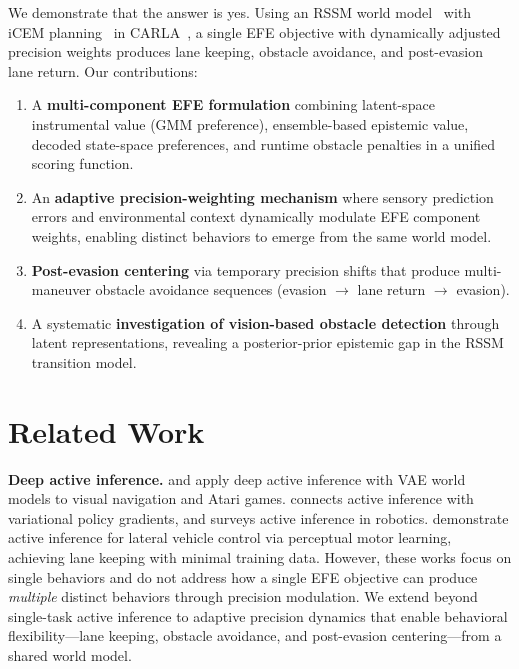 \documentclass{article}
\begin{document}
We demonstrate that the answer is yes. Using an RSSM world
model~\citep{hafner2023mastering} with iCEM
planning~\citep{pinneri2021sample} in
CARLA~\citep{dosovitskiy2017carla}, a single EFE objective with
dynamically adjusted precision weights produces lane keeping,
obstacle avoidance, and post-evasion lane return. Our contributions:

\begin{enumerate}
    \item A \textbf{multi-component EFE formulation} combining
    latent-space instrumental value (GMM preference), ensemble-based
    epistemic value, decoded state-space preferences, and runtime
    obstacle penalties in a unified scoring function.

    \item An \textbf{adaptive precision-weighting mechanism} where
    sensory prediction errors and environmental context dynamically
    modulate EFE component weights, enabling distinct behaviors to
    emerge from the same world model.

    \item \textbf{Post-evasion centering} via temporary precision
    shifts that produce multi-maneuver obstacle avoidance sequences
    (evasion $\rightarrow$ lane return $\rightarrow$ evasion).

    \item A systematic \textbf{investigation of vision-based
    obstacle detection} through latent representations, revealing a
    posterior-prior epistemic gap in the RSSM transition model.
\end{enumerate}

\section{Related Work}

\textbf{Deep active inference.}
\citet{catal2020learning} and \citet{fountas2020deep} apply deep
active inference with VAE world models to visual navigation and
Atari games. \citet{millidge2020deep} connects active inference
with variational policy gradients, and
\citet{lanillos2021active} surveys active inference in robotics.
\citet{delavari2025perceptual} demonstrate active inference for
lateral vehicle control via perceptual motor learning, achieving
lane keeping with minimal training data. However, these works
focus on single behaviors and do not address how a single EFE
objective can produce \emph{multiple} distinct behaviors through
precision modulation. We extend beyond single-task active
inference to adaptive precision dynamics that enable behavioral
flexibility---lane keeping, obstacle avoidance, and post-evasion
centering---from a shared world model.
\end{document}
